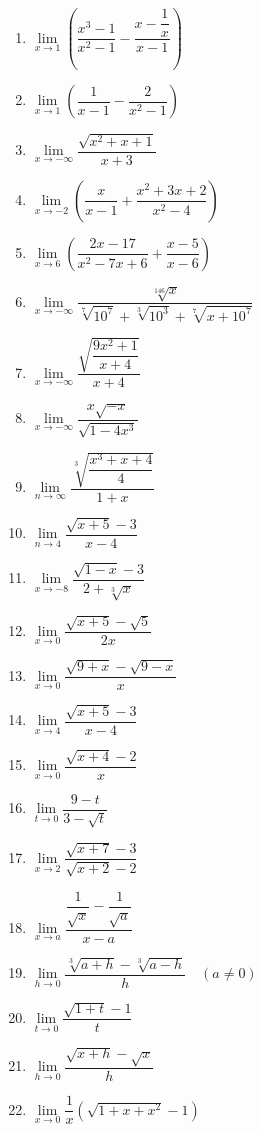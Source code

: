 \documentclass{report}
\begin{document}
\begin{multicols}{2}
\begin{enumerate}
            \item $\lim\limits_{x\to1}\left({\dfrac{x^{3}-1}{x^{2}-1}}-{\dfrac{x-{\dfrac{1}{x}}}{x-1}}\right)$
            \item $\lim\limits_{x\to 1}\left(\dfrac{1}{x-1}-\dfrac{2}{x^{2}-1}\right)$
            \item $\lim\limits_{x\to-\infty}{\dfrac{\sqrt{x^{2}+x+1}}{x+3}}$
            \item $\lim\limits_{x\to-2}\left(\dfrac{x}{x-1}+\dfrac{x^{2}+3x+2}{x^{2}-4}\right)$
            \item $\lim\limits_{x\to6}(\dfrac{2x-17}{x^{2}-7x+6}+\dfrac{x-5}{x-6})$
            \item $\lim\limits_{x\to-\infty}\dfrac{\sqrt[146]{x}}{\sqrt[7]{10^7}+\sqrt[3]{10^3}+\sqrt[7]{x+10^7}}$
            \item $\lim\limits_{x\to-\infty}{\dfrac{\sqrt{\dfrac{9x^{2}+1}{x+4}}}{x+4}}$
            \item $\lim\limits_{x\rightarrow-\infty}\dfrac{x\sqrt{-x}}{\sqrt{1-4x^{3}}}$
            \item $\lim\limits_{n\rightarrow\infty}{\dfrac{\sqrt[3]{\dfrac{x^{3}+x+4}{4}}}{1+x}}$
            \item $\lim\limits_{n\to4}\dfrac{\sqrt{x+5}-3}{x-4}$
            \item $\lim\limits_{x\to-8}\dfrac{\sqrt{1-x}-3}{2+\sqrt[3]{x}}$
            \item $\lim\limits_{x\to0}\dfrac{\sqrt{x+5}-\sqrt{5}}{2x}$
            \item $\lim\limits_{x\rightarrow0}\dfrac{\sqrt{9+x}-\sqrt{9-x}}{x}$
            \item $\lim\limits_{x\to4}{\dfrac{{\sqrt{x+5}}-3}{x-4}}$
            \item $\lim\limits_{x\to0}{\dfrac{{\sqrt{x+4}}-2}{x}}$
            \item $\lim\limits_{t\to0}{\dfrac{9-t}{3-{\sqrt{t}}}}$
            \item $\lim\limits_{x\to2}\dfrac{\sqrt{x+7}-3}{\sqrt{x+2}-2}$
            \item $\lim\limits_{x\to a}\dfrac{\dfrac{1}{\sqrt{x}}-\dfrac{1}{\sqrt{a}}}{x-a}$
            \item $\lim\limits_{h\to0}{\dfrac{{\sqrt[3]{a+h}}-\sqrt[3]{a-h}}{h}} \quad (a\neq0)$
            \item $\lim\limits_{t\to0}{\dfrac{\sqrt{1+t}-1}{t}}$
            \item $\lim\limits_{h\to0}{\dfrac{\sqrt{x+h}-\sqrt{x}}{h}}$
            \item $\lim\limits_{x\to0}\dfrac{1}{x}(\sqrt{1+x+x^{2}}-1)$

\end{enumerate}
\end{multicols}
\end{document}
